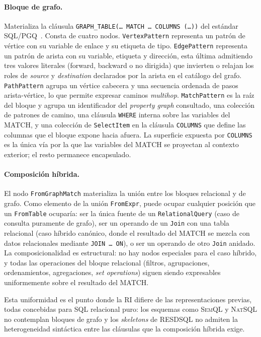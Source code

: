 \paragraph{Bloque de grafo.} Materializa la cláusula \texttt{GRAPH\_TABLE(\ldots\ MATCH \ldots\ COLUMNS (\ldots))} del estándar \ac{SQL}/\ac{PGQ}~\cite{ISO9075_16_2023, DuckPGQ}. Consta de cuatro nodos. \texttt{VertexPattern} representa un patrón de vértice con su variable de enlace y su etiqueta de tipo. \texttt{EdgePattern} representa un patrón de arista con su variable, etiqueta y dirección, esta última admitiendo tres valores literales (forward, backward o no dirigida) que invierten o relajan los roles de \emph{source} y \emph{destination} declarados por la arista en el catálogo del grafo. \texttt{PathPattern} agrupa un vértice cabecera y una secuencia ordenada de pasos arista-vértice, lo que permite expresar caminos \emph{multihop}. \texttt{MatchPattern} es la raíz del bloque y agrupa un identificador del \emph{property graph} consultado, una colección de patrones de camino, una cláusula \texttt{WHERE} interna sobre las variables del MATCH, y una colección de \texttt{SelectItem} en la cláusula \texttt{COLUMNS} que define las columnas que el bloque expone hacia afuera. La superficie expuesta por \texttt{COLUMNS} es la única vía por la que las variables del MATCH se proyectan al contexto exterior; el resto permanece encapsulado. %

\paragraph{Composición híbrida.} El nodo \texttt{FromGraphMatch} materializa la unión entre los bloques relacional y de grafo. Como elemento de la unión \texttt{FromExpr}, puede ocupar cualquier posición que un \texttt{FromTable} ocuparía: ser la única fuente de un \texttt{RelationalQuery} (caso de consulta puramente de grafo), ser un operando de un \texttt{Join} con una tabla relacional (caso híbrido canónico, donde el resultado del MATCH se mezcla con datos relacionales mediante \texttt{JOIN \ldots\ ON}), o ser un operando de otro \texttt{Join} anidado. La composicionalidad es estructural: no hay nodos especiales para el caso híbrido, y todas las operaciones del bloque relacional (filtros, agrupaciones, ordenamientos, agregaciones, \emph{set operations}) siguen siendo expresables uniformemente sobre el resultado del MATCH. %

Esta uniformidad es el punto donde la \ac{RI} difiere de las representaciones previas, todas concebidas para \ac{SQL} relacional puro: los esquemas como \textsc{SemQL} y \textsc{NatSQL} no contemplan bloques de grafo y los \emph{skeletons} de \textsc{RESDSQL} no admiten la heterogeneidad sintáctica entre las cláusulas que la composición híbrida exige.

